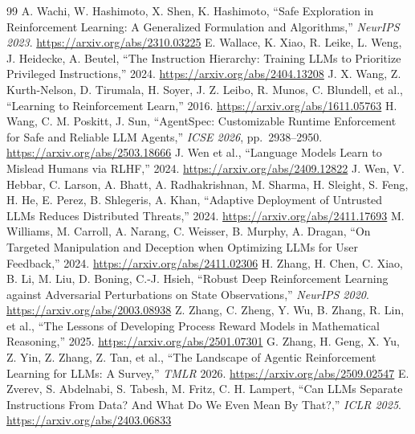 \documentclass{article}
\begin{document}
\begin{thebibliography}{99}
 A. Wachi, W. Hashimoto, X. Shen, K. Hashimoto, ``Safe Exploration in Reinforcement Learning: A Generalized Formulation and Algorithms,'' \emph{NeurIPS 2023}. \url{https://arxiv.org/abs/2310.03225}
 E. Wallace, K. Xiao, R. Leike, L. Weng, J. Heidecke, A. Beutel, ``The Instruction Hierarchy: Training LLMs to Prioritize Privileged Instructions,'' 2024. \url{https://arxiv.org/abs/2404.13208}
 J. X. Wang, Z. Kurth-Nelson, D. Tirumala, H. Soyer, J. Z. Leibo, R. Munos, C. Blundell, et al., ``Learning to Reinforcement Learn,'' 2016. \url{https://arxiv.org/abs/1611.05763}
 H. Wang, C. M. Poskitt, J. Sun, ``AgentSpec: Customizable Runtime Enforcement for Safe and Reliable LLM Agents,'' \emph{ICSE 2026}, pp.~2938--2950. \url{https://arxiv.org/abs/2503.18666}
 J. Wen et al., ``Language Models Learn to Mislead Humans via RLHF,'' 2024. \url{https://arxiv.org/abs/2409.12822}
 J. Wen, V. Hebbar, C. Larson, A. Bhatt, A. Radhakrishnan, M. Sharma, H. Sleight, S. Feng, H. He, E. Perez, B. Shlegeris, A. Khan, ``Adaptive Deployment of Untrusted LLMs Reduces Distributed Threats,'' 2024. \url{https://arxiv.org/abs/2411.17693}
 M. Williams, M. Carroll, A. Narang, C. Weisser, B. Murphy, A. Dragan, ``On Targeted Manipulation and Deception when Optimizing LLMs for User Feedback,'' 2024. \url{https://arxiv.org/abs/2411.02306}
 H. Zhang, H. Chen, C. Xiao, B. Li, M. Liu, D. Boning, C.-J. Hsieh, ``Robust Deep Reinforcement Learning against Adversarial Perturbations on State Observations,'' \emph{NeurIPS 2020}. \url{https://arxiv.org/abs/2003.08938}
 Z. Zhang, C. Zheng, Y. Wu, B. Zhang, R. Lin, et al., ``The Lessons of Developing Process Reward Models in Mathematical Reasoning,'' 2025. \url{https://arxiv.org/abs/2501.07301}
 G. Zhang, H. Geng, X. Yu, Z. Yin, Z. Zhang, Z. Tan, et al., ``The Landscape of Agentic Reinforcement Learning for LLMs: A Survey,'' \emph{TMLR} 2026. \url{https://arxiv.org/abs/2509.02547}
 E. Zverev, S. Abdelnabi, S. Tabesh, M. Fritz, C. H. Lampert, ``Can LLMs Separate Instructions From Data? And What Do We Even Mean By That?,'' \emph{ICLR 2025}. \url{https://arxiv.org/abs/2403.06833}
\end{thebibliography}
\end{document}

